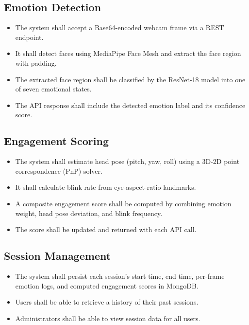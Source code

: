 \subsection{Emotion Detection}
\begin{itemize}
    \item The system shall accept a Base64-encoded webcam frame via a REST
          endpoint.
    \item It shall detect faces using MediaPipe Face Mesh and extract the
          face region with padding.
    \item The extracted face region shall be classified by the ResNet-18
          model into one of seven emotional states.
    \item The API response shall include the detected emotion label and its
          confidence score.
\end{itemize}

\subsection{Engagement Scoring}
\begin{itemize}
    \item The system shall estimate head pose (pitch, yaw, roll) using a
          3D-2D point correspondence (PnP) solver.
    \item It shall calculate blink rate from eye-aspect-ratio landmarks.
    \item A composite engagement score shall be computed by combining
          emotion weight, head pose deviation, and blink frequency.
    \item The score shall be updated and returned with each API call.
\end{itemize}

\subsection{Session Management}
\begin{itemize}
    \item The system shall persist each session's start time, end time,
          per-frame emotion logs, and computed engagement scores in MongoDB.
    \item Users shall be able to retrieve a history of their past sessions.
    \item Administrators shall be able to view session data for all users.
\end{itemize}

